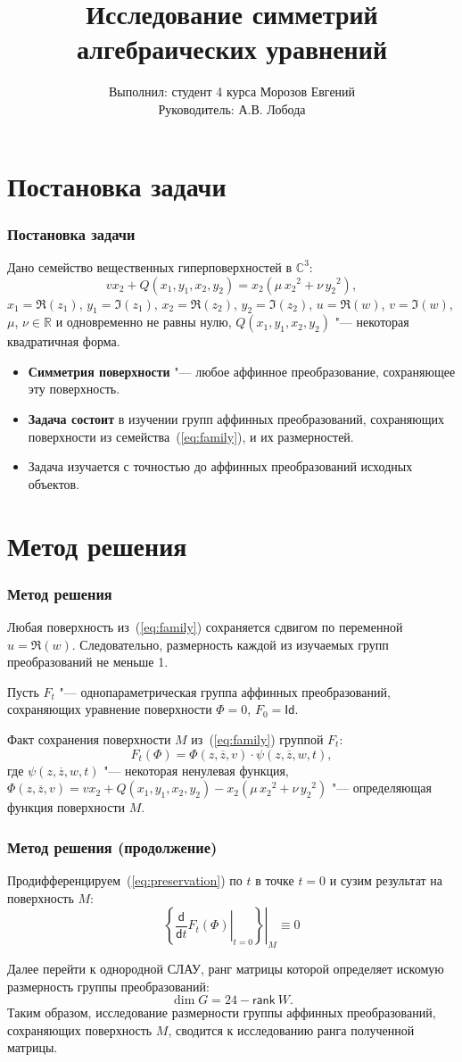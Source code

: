 \documentclass[russian,hyperref={unicode}]{beamer}
\title{Исследование симметрий алгебраических уравнений}
\institute
{
	Воронежский Государственный Университет \\
	Факультет Компьютерных Наук \\
	Кафедра Цифровых Технологий
}
\author
{
	Выполнил: студент 4 курса Морозов Евгений \\
	Руководитель: А.В. Лобода
}
\begin{document}
\frame{\titlepage}

\section{Постановка задачи}
\frame
{
  \frametitle{Постановка задачи}
  Дано семейство вещественных гиперповерхностей в $\mathbb{C}^3$:
  \begin{equation}\label{eq:family}
    v x_2 + Q(x_1, y_1, x_2, y_2) = x_2 (\mu\,{x_2}^2 + \nu\,{y_2}^2),
  \end{equation}
  $x_1 = \Re(z_1)$, $y_1 = \Im(z_1)$, $x_2 = \Re(z_2)$, $y_2 = \Im(z_2)$, $u = \Re(w)$,
  $v = \Im(w)$, $\mu$, $\nu \in \mathbb{R}$ и одновременно не равны нулю, $Q(x_1, y_1,
  x_2, y_2)$ "--- некоторая квадратичная форма.

  \begin{itemize}
	\item \textbf{Симметрия поверхности} "--- любое аффинное преобразование, сохраняющее эту поверхность.
    \item \textbf{Задача состоит} в изучении групп аффинных преобразований, сохраняющих поверхности из семейства~(\ref{eq:family}), и их размерностей.
	\item Задача изучается с точностью до аффинных преобразований исходных объектов.
  \end{itemize}
}
\section{Метод решения}
\frame
{
  \frametitle{Метод решения}
  Любая поверхность из~(\ref{eq:family}) сохраняется сдвигом по переменной $u = \Re(w)$. Следовательно, размерность каждой из изучаемых групп преобразований не меньше 1. 
  
  Пусть $F_t$ "--- однопараметрическая группа аффинных преобразований, сохраняющих уравнение поверхности $\Phi = 0$, $F_0 = \mathsf{Id}$. 
  
  Факт сохранения поверхности $M$ из~(\ref{eq:family}) группой $F_t$:
  \begin{equation}\label{eq:preservation}
  	F_t(\Phi) = \Phi(z, \overline{z}, v) \cdot \psi(z, \overline{z}, w, t),
  \end{equation}
  где $\psi(z, \overline{z}, w, t)$ "--- некоторая ненулевая функция, $\Phi(z, \overline{z}, v) = v x_2 + Q(x_1, y_1, x_2, y_2) - x_2 (\mu\,{x_2}^2 + \nu\,{y_2}^2)$ "--- определяющая функция поверхности $M$.
}
\frame
{
  \frametitle{Метод решения (продолжение)}
  Продифференцируем~(\ref{eq:preservation}) по $t$ в точке $t=0$ и сузим результат на поверхность $M$:
  \begin{equation}\label{eq:main_eq}
  	\left.\left\{ \left.\frac{\mathsf d}{\mathsf d t}F_t(\Phi) \right|_{t=0}\right\}\right|_{M} \equiv 0
  \end{equation}
  
  Далее перейти к однородной СЛАУ, ранг матрицы которой определяет искомую размерность группы преобразований:
  $$
  	\dim G = 24 - \mathsf{rank}\ W.
  $$
  Таким образом, исследование размерности группы аффинных преобразований, сохраняющих поверхность $M$, сводится к исследованию ранга полученной матрицы.
}
\end{document}
